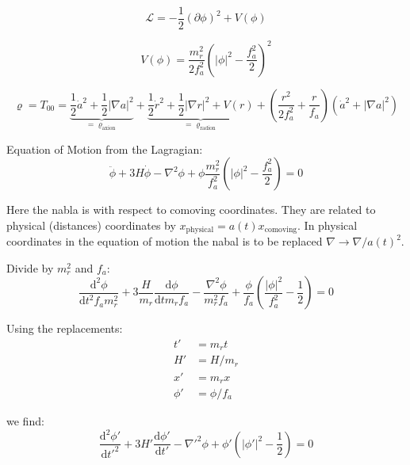 \documentclass[a4paper]{article}
\begin{document}
\begin{equation}
    \mathcal{L} = - \frac{1}{2} ( \partial \phi )^2 + V(\phi)
\end{equation}

\begin{equation}
    V(\phi) = \frac{m_r^2}{2 f_a^2}\left( |\phi|^2 - \frac{f_a^2}{2} \right)^2
\end{equation}

\begin{equation}
    \varrho = T_{00} = \underbrace{\frac{1}{2} \dot{a}^2 + \frac{1}{2} | \nabla a|^2}_{= \varrho_\mathrm{axion}}
    + \underbrace{ \frac{1}{2} \dot{r}^2 + \frac{1}{2} | \nabla r|^2 + V(r) }_{= \varrho_\mathrm{radion}}
    + \left(\frac{r^2}{2 f_a^2} + \frac{r}{f_a} \right) (\dot{a}^2 + |\nabla a|^2)
\end{equation}

Equation of Motion from the Lagragian:
\begin{equation}
    \ddot{\phi} + 3 H \dot{\phi} - \nabla^2 \phi + \phi \frac{m_r^2}{f_a^2} \left( |\phi|^2 - \frac{f_a^2}{2} \right) = 0
\end{equation}

Here the nabla is with respect to comoving coordinates. They are related to physical (distances) coordinates by $x_\mathrm{physical} = a(t) x_\mathrm{comoving}$.
In physical coordinates in the equation of motion the nabal is to be replaced $\nabla \to \nabla / a(t)^2$.


Divide by $m_r^2$ and $f_a$:
\begin{equation}
    \frac{\mathrm{d}^2 {\phi}}{\mathrm{d} t^2 f_a m_r^2} + 3 \frac{H}{m_r} \frac{\mathrm{d} \phi}{\mathrm{d} t m_r f_a} - \frac{\nabla^2 \phi}{m_r^2 f_a} + \frac{\phi}{f_a} \left( \frac{ |\phi|^2 } { f_a^2 } - \frac{1}{2} \right) = 0
\end{equation}

Using the replacements:
\begin{align}
    t' &= m_r t \\
    H' &= H / m_r \\
    x' &= m_r x \\
    \phi' &= \phi / f_a
\end{align}

we find:
\begin{equation}
    \frac{\mathrm{d}^2 \phi'}{\mathrm{d} t'^2} + 3 H' \frac{\mathrm{d} \phi'}{\mathrm{d} t'} - \nabla'^2 \phi + \phi' \left( |\phi'|^2 - \frac{1}{2} \right) = 0
\end{equation}
\end{document}
